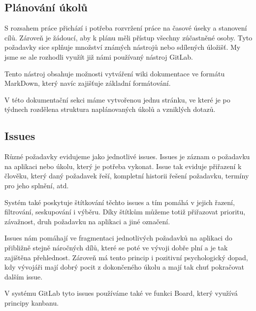 \documentclass[czech,BP]{thesiskiv}
\begin{document}
\subsection{Plánování úkolů}
	\par S rozsahem práce přichází i potřeba rozvržení práce na časové úseky a stanovení cílů. Zároveň je žádoucí, aby k plánu měli přístup všechny zúčastněné osoby. Tyto požadavky sice splňuje množství známých nástrojů nebo sdílených úložišť. My jsme se ale rozhodli využít již námi používaný nástroj GitLab.
	\par Tento nástroj obsahuje možnosti vytváření wiki dokumentace ve formátu MarkDown, který navíc zajišťuje základní formátování.
	\par V této dokumentační sekci máme vytvořenou jednu stránku, ve které je po týdnech rozdělena struktura naplánovaných úkolů a vzniklých dotazů.
\subsection{Issues}
	\par Různé požadavky evidujeme jako jednotlivé issues. Issues je záznam o požadavku na aplikaci nebo úkolu, který je potřeba vykonat. Issue tak eviduje přiřazení k člověku, který daný požadavek řeší, kompletní historii řešení požadavku, termíny pro jeho splnění, atd.
	\par Systém také poskytuje štítkování těchto issues a tím pomáhá v jejich řazení, filtrování, seskupování i výběru. Díky štítkům můžeme totiž přiřazovat prioritu, závažnost, druh požadavku na aplikaci a jiné označení.
	\par Issues nám pomáhají ve fragmentaci  jednotlivých požadavků na aplikaci do přibližně stejně náročných dílů, které se poté ve vývoji dobře plní a je tak zajištěna přehlednost. Zároveň má tento princip i pozitivní psychologický dopad, kdy vývojáři mají dobrý pocit z dokončeného úkolu a mají tak chuť pokračovat dalším issue.
	\par V systému GitLab tyto issues používáme také ve funkci Board, který využívá principy kanbanu.
\end{document}

